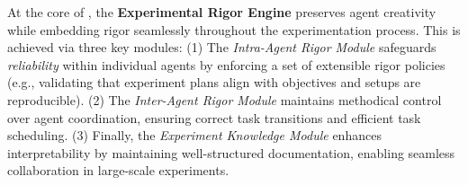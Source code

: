 

At the core of \sys, the \textbf{Experimental Rigor Engine} preserves agent creativity while embedding rigor seamlessly throughout the experimentation process.
This is achieved via three key modules:
(1) The \textit{Intra-Agent Rigor Module} safeguards \textit{reliability} within individual agents by enforcing a set of extensible rigor policies (e.g., validating that experiment plans align with objectives and setups are reproducible).
(2) The \textit{Inter-Agent Rigor Module} 
maintains methodical control over agent coordination, ensuring correct task transitions and efficient task scheduling.
(3) Finally, the \textit{Experiment Knowledge Module} 
enhances interpretability by maintaining well-structured documentation, enabling seamless collaboration in large-scale experiments.
 

